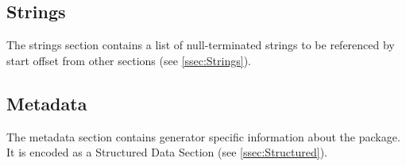 \subsection{Strings}
The strings section contains a list of null-terminated strings to be referenced by start offset from other sections (see \ref{ssec:Strings}).

\subsection{Metadata}
The metadata section contains generator specific information about the package. It is encoded as a Structured Data Section (see \ref{ssec:Structured}).
